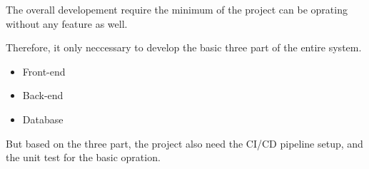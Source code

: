 The overall developement require the minimum of the project can be oprating 
without any feature as well.

Therefore, it only neccessary to develop the basic three part of the entire system.

\begin{itemize}
    \item Front-end
    \item Back-end
    \item Database
\end{itemize}

But based on the three part, the project also need the CI/CD pipeline setup,
and the unit test for the basic opration.

